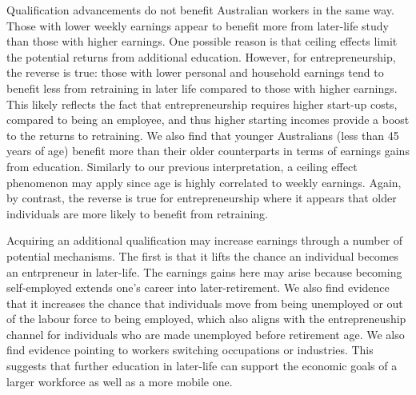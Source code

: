 \documentclass[12pt, a4paper]{article}
\begin{document}

Qualification advancements do not benefit Australian workers in the same way. Those with lower weekly earnings appear to benefit more from later-life study
than those with higher earnings. One possible reason is that ceiling effects
limit the potential returns from additional education. However, for entrepreneurship, the reverse is true: those with lower personal and household earnings tend to benefit less from retraining in later life compared to those with higher earnings. This likely reflects the fact that entrepreneurship requires higher start-up costs, compared to being an employee, and thus higher starting incomes provide a boost to the returns to retraining. We also find that
younger Australians (less than 45 years of age) benefit more than their older
counterparts in terms of earnings gains from education. Similarly to our previous interpretation, a ceiling effect phenomenon may apply since age is highly
correlated to weekly earnings. Again, by contrast, the reverse is true for entrepreneurship where it appears that older individuals are more likely to benefit from retraining.


Acquiring an additional qualification may increase earnings through a number of potential mechanisms. The first is that it lifts the chance an individual becomes an entrpreneur in later-life. The earnings gains here may arise because becoming self-employed extends one's career into later-retirement. We also find evidence that it increases the chance that individuals move from being unemployed or out of the labour force to being employed, which also aligns with the entrepreneuship channel for individuals who are made unemployed before retirement age. We also find evidence pointing to workers switching occupations or industries. This suggests that further education in later-life can support the economic goals of a larger workforce as well as a more mobile one.
\end{document}
